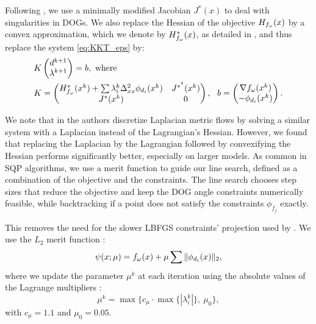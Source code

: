 Following \cite{rabi2018shape}, we use a minimally modified Jacobian $J^*(x)$ to deal with singularities in DOGs. We also replace the Hessian of the objective $H_{f_\omega}(x)$ by a convex approximation, which we denote by $H^*_{f_\omega}(x)$, as detailed in , and thus replace the system \eqref{eq:KKT_eps} by:
%
\begin{align} 
\label{eq:linear_system}
&{K} \begin{pmatrix} d^{k+1} \\ \lambda^{k+1} \end{pmatrix}={b}, \ \text{where} \\
\nonumber
&{K}=\begin{pmatrix}
{ H^*_{f_\omega}(\x^k)+\sum\lambda_i^{k} \Delta^2_{xx} \phi_{d_i}(\x^k)} & {J^{*^\tr}(\x^k)}\\
{J^*(\x^k)} &  0 \\
\end{pmatrix}, \ \ 
{b}=\begin{pmatrix}
{\nabla f_\omega(x^k)} \\ 
-\phi_{d_i}(x^k)\\
\end{pmatrix}.
\end{align}

We note that in \cite{rabi2018shape} the authors discretize Laplacian metric flows by solving a similar system with a Laplacian instead of the Lagrangian's Hessian. However, we found that replacing the Laplacian by the Lagrangian followed by convexifying the Hessian performs significantly better, especially on larger models. As common in SQP algorithms, we use a merit function to guide our line search, defined as a combination of the objective and the constraints. The line search chooses step sizes that reduce the objective and keep the DOG angle constraints numerically feasible, while backtracking if a point does not satisfy the constraints $\phi_{f_j}$ exactly.

This removes the need for the slower LBFGS constraints' projection used by \cite{rabi18,rabi2018shape}. We use the $L_2$ merit function \cite{nocedal}:
\begin{equation}
\psi(x;\mu) = f_\omega(x)+\mu\sum\|\phi_{d_i}(x)\|_2,
\end{equation}
where we update the parameter $\mu^k$ at each iteration using the absolute values of the Lagrange multipliers \cite{nocedal}:
\begin{equation}
\mu^k = \max\{c_\mu \cdot \max\{|{\lambda_i^k}|\},\ \mu_0\},
\end{equation}
with $c_\mu = 1.1$ and $\mu_0 = 0.05$.